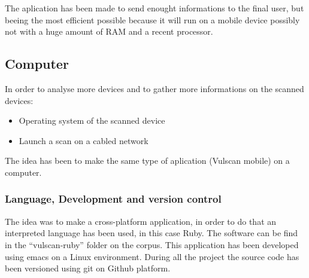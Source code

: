 \documentclass{report}
\begin{document}
The aplication has been made to send enought informations to the final user, but beeing the most efficient possible because it will run on a mobile device possibly not with a huge amount of RAM and a recent processor.

\subsection{Computer}
In order to analyse more devices and to gather more informations on the scanned devices:
\begin{itemize}
 \item Operating system of the scanned device
 \item Launch a scan on a cabled network
\end{itemize}
The idea has been to make the same type of aplication (Vulscan mobile) on a computer.

\subsubsection{Language, Development and version control}
The idea was to make a cross-platform application, in order to do that an interpreted language has been used, in this case Ruby.
The software can be find in the ``vulscan-ruby'' folder on the corpus. This application has been developed using emacs on a Linux environment.\newline
During all the project the source code has been versioned using git on Github platform.
\end{document}
